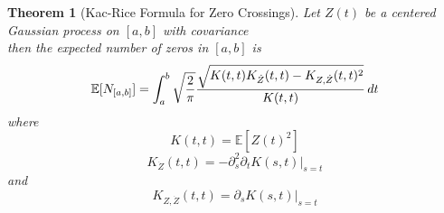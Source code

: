 \documentclass{article}
\newtheorem{theorem}{Theorem}
\begin{document}
\begin{theorem}[Kac-Rice Formula for Zero Crossings]
  \label{thm:kac_rice}Let $Z (t)$ be a centered Gaussian process on $[a, b]$
  with covariance
  \begin{equation}
    \ 
  \end{equation}
  then the expected number of zeros in $[a, b]$ is
  \begin{equation}
    \label{eq:kac_rice} \mathbb{E} [N_{[a, b]}] = \int_a^b
    \sqrt{\frac{2}{\pi}}  \frac{\sqrt{K (t, t) K_{\dot{Z}} (t, t) - K_{Z,
    \dot{Z}} (t, t)^2}}{K (t, t)}  \hspace{0.17em} dt
  \end{equation}
  where
  \begin{equation}
    K (t, t) =\mathbb{E} [Z (t)^2]
  \end{equation}
  \begin{equation}
    K_{\dot{Z}} (t, t) = - \partial^2_s \partial_t K (s, t) |_{s = t}
  \end{equation}
  and
  \begin{equation}
    K_{Z, \dot{Z}} (t, t) = \partial_s K (s, t) |_{s = t}
  \end{equation}
\end{theorem}
\end{document}
